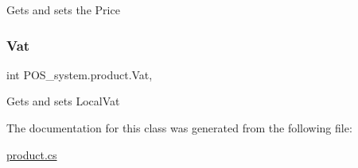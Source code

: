Gets and sets the Price 

\mbox{\label{class_p_o_s__system_1_1product_aeaae4adfbfee9dc8b074bd2621e46028}} 
\subsubsection{\texorpdfstring{Vat}{Vat}}
{\footnotesize\ttfamily int P\+O\+S\+\_\+system.\+product.\+Vat\hspace{0.3cm}{\ttfamily [get]}, {\ttfamily [set]}}



Gets and sets Local\+Vat 



The documentation for this class was generated from the following file\+:\begin{DoxyCompactItemize}
\item 
\mbox{\hyperlink{product_8cs}{product.\+cs}}\end{DoxyCompactItemize}
